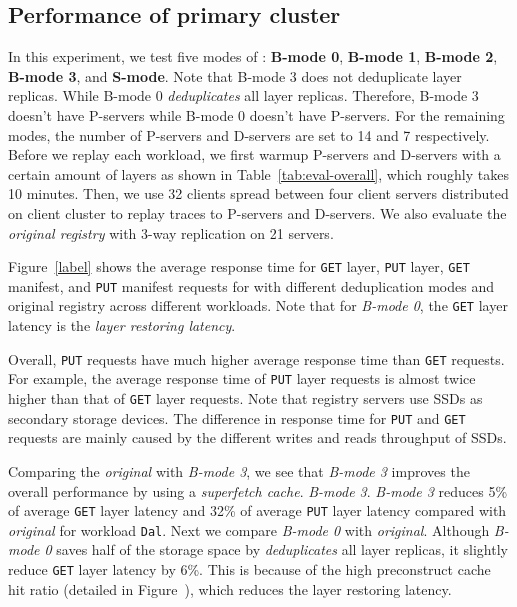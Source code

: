 \subsection{Performance of primary cluster }
In this experiment,
we test five modes of \sysname:
\textbf{B-mode 0},
\textbf{B-mode 1},
\textbf{B-mode 2},
\textbf{B-mode 3}, and
\textbf{S-mode}.
Note that B-mode 3 does not deduplicate layer replicas.
While B-mode 0 \emph{deduplicates} all layer replicas. 
Therefore, B-mode 3 doesn't have P-servers while
B-mode 0 doesn't have P-servers.
For the remaining modes,
the number of P-servers and D-servers are set to 14 and 7 respectively.
Before we replay each workload, we first warmup P-servers and D-servers with a certain amount of layers as shown in Table~\ref{tab:eval-overall}, which roughly takes 10 minutes.
Then, we use 32 clients spread between four client servers distributed on client cluster to replay traces to P-servers and D-servers.
We also evaluate the \emph{original registry} with 3-way replication on 21 servers. 

Figure~\ref{label} shows the average response time for \texttt{GET} layer, \texttt{PUT} layer, \texttt{GET} manifest, and \texttt{PUT} manifest requests for \sysname with different deduplication modes and original registry across different workloads.
Note that for \emph{B-mode 0}, the \texttt{GET} layer latency is the \emph{layer restoring latency}.

Overall, \texttt{PUT} requests have much higher average response time than \texttt{GET} requests.
For example, the average response time of 
\texttt{PUT} layer requests is almost twice higher than that of \texttt{GET} layer requests.
Note that registry servers use SSDs as secondary storage devices.
The difference in response time for \texttt{PUT} and \texttt{GET} requests are mainly caused by the different writes and reads throughput of SSDs. 

Comparing the \emph{original} with \emph{B-mode 3},
we see that \emph{B-mode 3} improves the overall performance by using a \emph{superfetch cache}.
\emph{B-mode 3}.
\emph{B-mode 3} reduces 5\% of average \texttt{GET} layer latency
and 32\% of average \texttt{PUT} layer latency compared with \emph{original} for workload \texttt{Dal}.
Next we compare \emph{B-mode 0} with \emph{original}.
Although \emph{B-mode 0} saves half of the storage space
by \emph{deduplicates} all layer replicas,
it slightly reduce \texttt{GET} layer latency by 6\%.
This is because of the high preconstruct cache hit ratio (detailed in Figure~\cite{xxx}), 
which reduces the layer restoring latency.

